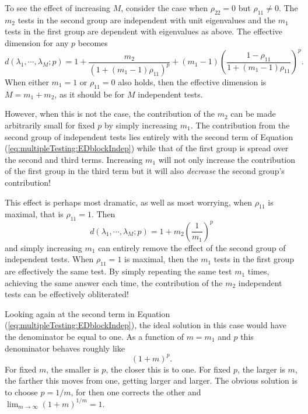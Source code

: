 \documentclass[letterpaper,12pt,oneside,final]{article}
\begin{document}
To see the effect of increasing $M$, consider the case when $\rho_{22} = 0$ but $\rho_{11} \ne 0$.  The $m_2$ tests in the second group are independent with unit eigenvalues and the $m_1$ tests in the first group are dependent with eigenvalues as above.   
The effective dimension for any $p$ becomes
\begin{equation}
d(\lambda_1, \cdots, \lambda_M; p) = 1 
       + \frac{m_2}{ \left(1 + (m_1 - 1) \rho_{11}\right)^p}
       + (m_1 - 1) \left( 
               \frac{1- \rho_{11}}
                      {1 + (m_1 - 1) \rho_{11}}  
                 \right)^p.
\label{eq:multipleTesting:EDblockIndep}
\end{equation}  
When either $m_1 = 1$ or $\rho_{11} = 0$  also holds, then the effective dimension is $M = m_1 + m_2$, as it should be for $M$ independent tests.

However, when this is not the case, the contribution of the $m_2$ can be made arbitrarily small for fixed $p$ by simply increasing $m_1$. The contribution from the second group of independent tests lies entirely with the second term of 
Equation (\ref{eq:multipleTesting:EDblockIndep}) while that of the first group is spread over the second and third terms. Increasing $m_1$ will not only increase the contribution of the first group in the third term but it will also \emph{decrease} the second group's contribution!  

This effect is perhaps most dramatic, as well as most worrying, when $\rho_{11}$ is maximal, that is $\rho_{11} = 1$.  Then
\[
d(\lambda_1, \cdots, \lambda_M; p) = 1 + m_2 \left(\frac{1}{ m_1} \right)^p
\]
and simply increasing $m_1$ can entirely remove the effect of the second group of independent tests.
When $\rho_{11} = 1$ is maximal, then the $m_1$ tests in the first group are effectively the same test.  
By simply repeating the same test $m_1$ times, achieving the same answer each time, the contribution of the $m_2$ independent tests can be effectively obliterated!

Looking again at the second term in Equation (\ref{eq:multipleTesting:EDblockIndep}), the ideal solution in this case would have the denominator be equal to one.  As a function of $m = m_1$ and $p$ this denominator behaves roughly like 
\[(1 + m)^p.\]
For fixed $m$, the smaller is $p$, the closer this is to one.  For fixed $p$, the larger is $m$, the farther this moves from one, getting larger and larger.  The obvious solution is to choose $p = 1/m$, for then one corrects the other and  $\lim_{m \rightarrow \infty} (1 + m)^{1/m} = 1$.
\end{document}
